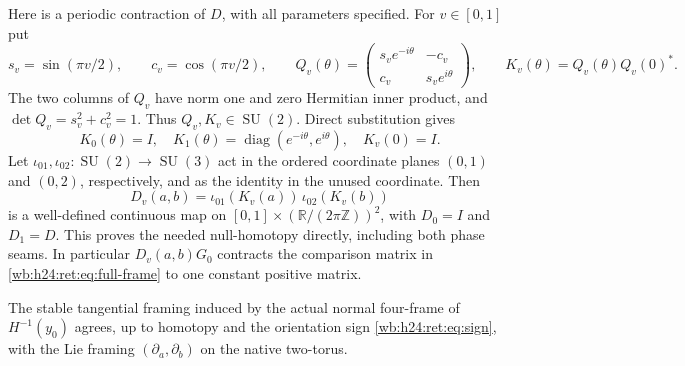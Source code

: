 Here is a periodic contraction of \(D\), with all parameters
specified.  For \(v\in[0,1]\) put
\[
 s_v=\sin(\pi v/2),\qquad c_v=\cos(\pi v/2),\qquad
 Q_v(\theta)=
 \begin{pmatrix}s_ve^{-i\theta}&-c_v\\c_v&s_ve^{i\theta}\end{pmatrix},
 \qquad K_v(\theta)=Q_v(\theta)Q_v(0)^*.
\]
The two columns of \(Q_v\) have norm one and zero Hermitian inner
product, and \(\det Q_v=s_v^2+c_v^2=1\).  Thus
\(Q_v,K_v\in\operatorname{SU}(2)\).  Direct substitution gives
\[
 K_0(\theta)=I,\quad
 K_1(\theta)=\operatorname{diag}(e^{-i\theta},e^{i\theta}),\quad
 K_v(0)=I.
\]
Let \(\iota_{01},\iota_{02}:\operatorname{SU}(2)\to\operatorname{SU}(3)\) act in the
ordered coordinate planes \((0,1)\) and \((0,2)\), respectively,
and as the identity in the unused coordinate.  Then
\begin{equation}
 D_v(a,b)=\iota_{01}(K_v(a))\,\iota_{02}(K_v(b))
 \label{wb:h24:ret:eq:D-homotopy}
\end{equation}
is a well-defined continuous map on
\([0,1]\times(\mathbb R/(2\pi\mathbb Z))^2\), with
\(D_0=I\) and \(D_1=D\).  This proves the needed null-homotopy
directly, including both phase seams.  In particular
\(D_v(a,b)G_0\) contracts the comparison matrix in
\eqref{wb:h24:ret:eq:full-frame} to one constant positive matrix.

\begin{proposition}\label{wb:h24:ret:framing-proposition}

The stable tangential framing induced by the actual normal four-frame
of \(H^{-1}(y_0)\) agrees, up to homotopy and the orientation sign
\eqref{wb:h24:ret:eq:sign}, with the Lie framing
\((\partial_a,\partial_b)\) on the native two-torus.
\end{proposition}


